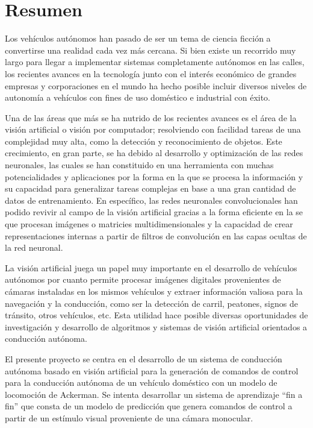 \chapter*{Resumen} %

Los vehículos autónomos han pasado de ser un tema de ciencia ficción a convertirse una realidad cada vez más 
cercana. Si bien existe un recorrido muy largo para llegar a implementar sistemas completamente autónomos en las calles, 
los recientes avances en la tecnología junto con el interés económico de grandes empresas y corporaciones en el mundo 
ha hecho posible incluir diversos niveles de autonomía a vehículos con fines de uso doméstico e industrial con éxito.

Una de las áreas que más se ha nutrido de los recientes avances es el área de la visión artificial o visión por computador; 
resolviendo con facilidad tareas de una complejidad muy alta, como la detección y reconocimiento de objetos. 
Este crecimiento, en gran parte, se ha debido al desarrollo y optimización de las redes neuronales, las cuales se han 
constituido en una herramienta con muchas potencialidades y aplicaciones por la forma en la que se procesa la información 
y su capacidad para generalizar tareas complejas en base a una gran cantidad de datos de entrenamiento. En específico, 
las redes neuronales convolucionales han podido revivir al campo de la visión artificial gracias a la forma eficiente 
en la se que procesan imágenes o matricies multidimensionales y la capacidad de crear representaciones internas a partir 
de filtros de convolución en las capas ocultas de la red neuronal\cite{krizhevsky2012imagenet}.

La visión artificial juega un papel muy importante en el desarrollo de vehículos autónomos por cuanto permite 
procesar imágenes digitales provenientes de cámaras instaladas en los mismos vehículos y extraer información 
valiosa para la navegación y la conducción, como ser la detección de carril, peatones, signos de tránsito, otros vehículos, 
etc. Esta utilidad hace posible diversas oportunidades de investigación y desarrollo de algoritmos y sistemas de visión 
artificial orientados a conducción autónoma.

El presente proyecto se centra en el desarrollo de un sistema de conducción autónoma basado en visión artificial para 
la generación de comandos de control para la conducción autónoma de un vehículo doméstico con un modelo de locomoción 
de Ackerman. Se intenta desarrollar un sistema de aprendizaje “fin a fin” que consta de un modelo de predicción 
que genera comandos de control a partir de un estímulo visual proveniente de una cámara monocular.